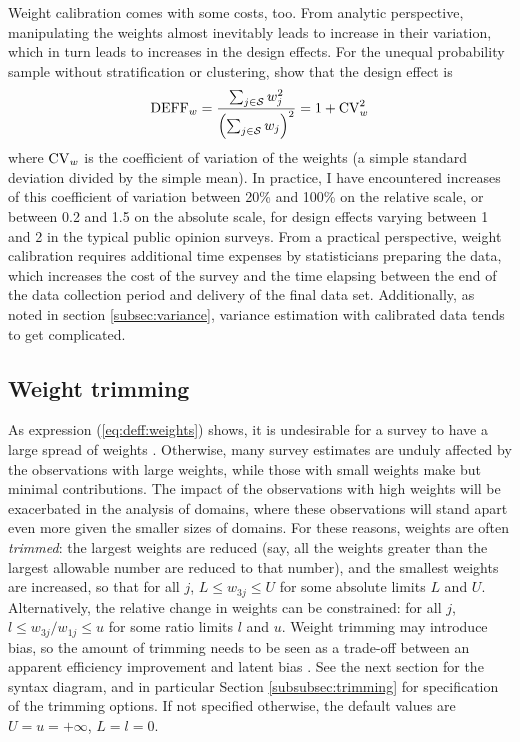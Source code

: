 Weight calibration comes with some costs, too. From analytic perspective,
manipulating the weights almost inevitably leads to increase in their
variation, which in turn leads to increases in the design effects.
For the unequal probability sample without stratification or clustering,
\citet{korn:graubard:1999} show that the design effect is
\begin{equation}
    {\rm DEFF}_w = \frac{\sum_{j \in \mathcal{S}} w_j^2 }%
       {\Bigl(\sum_{j \in \mathcal{S}} w_j\Bigr)^2}
    = 1 + {\rm CV}_w^2
    \label{eq:deff:weights}
\end{equation}
where ${\rm CV}_w$ is the coefficient of variation of the weights
(a simple standard deviation divided by the simple mean).
In practice, I have encountered increases of this coefficient
of variation between 20\% and 100\% on the relative scale,
or between 0.2 and 1.5 on the absolute scale, for design effects
varying between 1 and 2 in the typical public opinion surveys.
From a practical perspective, weight calibration requires
additional time expenses by statisticians preparing the data,
which increases the cost of the survey and the time elapsing
between the end of the data collection period and delivery
of the final data set. Additionally, as noted in section
\ref{subsec:variance}, variance estimation with calibrated
data tends to get complicated.

\subsection{Weight trimming}
\label{subsec:trimming}

As expression (\ref{eq:deff:weights}) shows, it is undesirable
for a survey to have a large spread of weights \citep{theberge:2000}.
Otherwise, many survey
estimates are unduly affected by the observations with large weights,
while those with small weights make but minimal contributions.
The impact of the observations with high weights will be exacerbated
in the analysis of domains, where these observations will stand apart
even more given the smaller sizes of domains.
For these reasons, weights are often {\it trimmed}: the largest
weights are reduced (say, all the weights greater than the largest allowable
number are reduced to that number), and the smallest weights are increased,
so that for all $j$, $L \le w_{3j} \le U$ for some absolute limits $L$ and $U$.
Alternatively, the relative change in weights can be constrained:
for all $j$, $l \le w_{3j}/w_{1j} \le u$ for some ratio limits $l$ and $u$.
Weight trimming may introduce bias, so the amount of trimming needs to be
seen as a trade-off between an apparent efficiency improvement
and latent bias \citep{elliott:2008}.
See the next section for the syntax diagram, and in particular
Section \ref{subsubsec:trimming} for specification of
the trimming options. If not specified otherwise, the default values
are $U=u=+\infty$, $L=l=0$.

